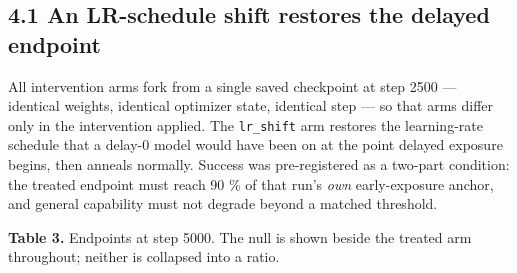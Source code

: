 \documentclass{article}
\begin{document}
\subsection{4.1 An LR-schedule shift restores the delayed endpoint}\label{an-lr-schedule-shift-restores-the-delayed-endpoint}

All intervention arms fork from a single saved checkpoint at step 2500 --- identical weights,
identical optimizer state, identical step --- so that arms differ only in the intervention
applied. The \texttt{lr\_shift} arm restores the learning-rate schedule that a delay-0 model would
have been on at the point delayed exposure begins, then anneals normally. Success was
pre-registered as a two-part condition: the treated endpoint must reach 90 \% of that run's
\emph{own} early-exposure anchor, and general capability must not degrade beyond a matched
threshold.

\textbf{Table 3.} Endpoints at step 5000. The null is shown beside the treated arm throughout;
neither is collapsed into a ratio.
\end{document}
